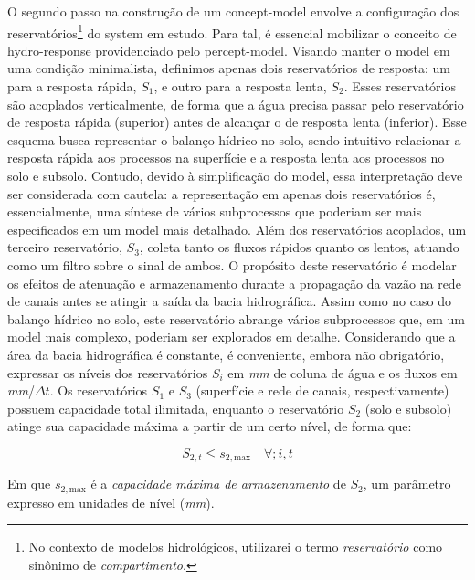 \documentclass[./main.tex]{subfiles}
\begin{document}
\par O segundo passo na construção de um \gls{concept-model} envolve a configuração dos reservatórios\footnote{No contexto de modelos hidrológicos, utilizarei o termo \textit{reservatório} como sinônimo de \textit{compartimento}.} do \gls{system} em estudo. Para tal, é essencial mobilizar o conceito de \gls{hydro-response} providenciado pelo \gls{percept-model}. Visando manter o \gls{model} em uma condição minimalista, definimos apenas dois reservatórios de resposta: um para a resposta rápida, $S_1$, e outro para a resposta lenta, $S_2$. Esses reservatórios são acoplados verticalmente, de forma que a água precisa passar pelo reservatório de resposta rápida (superior) antes de alcançar o de resposta lenta (inferior). Esse esquema busca representar o balanço hídrico no solo, sendo intuitivo relacionar a resposta rápida aos processos na superfície e a resposta lenta aos processos no solo e subsolo. Contudo, devido à simplificação do \gls{model}, essa interpretação deve ser considerada com cautela: a representação em apenas dois reservatórios é, essencialmente, uma síntese de vários subprocessos que poderiam ser mais especificados em um \gls{model} mais detalhado. Além dos reservatórios acoplados, um terceiro reservatório, $S_3$, coleta tanto os fluxos rápidos quanto os lentos, atuando como um filtro sobre o sinal de ambos. O propósito deste reservatório é modelar os efeitos de atenuação e armazenamento durante a propagação da vazão na rede de canais antes se atingir a saída da bacia hidrográfica. Assim como no caso do balanço hídrico no solo, este reservatório abrange vários subprocessos que, em um \gls{model} mais complexo, poderiam ser explorados em detalhe. Considerando que a área da bacia hidrográfica é constante, é conveniente, embora não obrigatório, expressar os níveis dos reservatórios $S_i$ em \textit{mm} de coluna de água e os fluxos em \textit{mm}/$\Delta t$. Os reservatórios $S_1$ e $S_3$ (superfície e rede de canais, respectivamente) possuem capacidade total ilimitada, enquanto o reservatório $S_2$ (solo e subsolo) atinge sua capacidade máxima a partir de um certo nível, de forma que:
\begin{linenomath*}
\begin{equation}
\label{eq:max_capacity}
S_{2, t} \leq s_{2,\text{max}} \quad \forall ; i, t
\end{equation}
\end{linenomath*}
Em que $s_{2, \text{max}}$ é a \textit{capacidade máxima de armazenamento} de $S_2$, um parâmetro expresso em unidades de nível (\textit{mm}).
\end{document}
